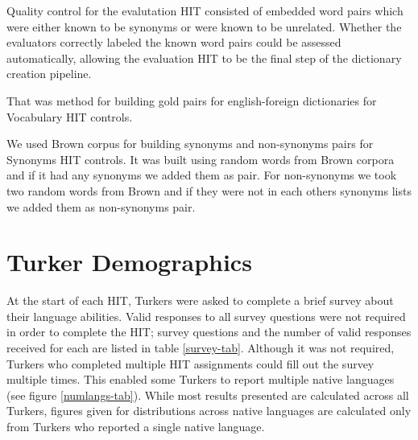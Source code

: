 \documentclass[11pt]{article}
\begin{document}
Quality control for the evalutation HIT consisted of embedded word pairs which were either known to be synonyms or were known to be unrelated. Whether the evaluators correctly labeled the known word pairs could be assessed automatically, allowing the evaluation HIT to be the final step of the dictionary creation pipeline.


That was method for building gold pairs for english-foreign dictionaries for Vocabulary HIT controls.

We used Brown corpus for building synonyms and non-synonyms pairs for Synonyms HIT controls.
It was built using random words from Brown corpora and if it had any synonyms we added them as pair.
For non-synonyms we took two random words from Brown and if they were not in each others synonyms lists we added them as non-synonyms pair.


\section{Turker Demographics}
At the start of each HIT, Turkers were asked to complete a brief survey about their language abilities. Valid responses to all survey questions were not required in order to complete the HIT; survey questions and the number of valid responses received for each are listed in table \ref{survey-tab}. Although it was not required, Turkers who completed multiple HIT assignments could fill out the survey multiple times. This enabled some Turkers to report multiple native languages (see figure \ref{numlangs-tab}). While most results presented are calculated across all Turkers, figures given for distributions across native languages are calculated only from Turkers who reported a single native language.\\

\end{document}
